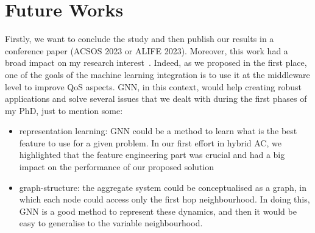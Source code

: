 \documentclass{article}
\begin{document}
\section{Future Works}
Firstly, we want to conclude the study and then publish our results in a conference paper (ACSOS 2023 or ALIFE 2023).
Moreover, this work had a broad impact on my research interest~\cite{aguzzi2021research, aguzzi2022addressing, aguzzi2022towards, DBLP:conf/icdcs/AguzziCV22}. 
Indeed, as we proposed in the first place, one of the goals of the machine learning integration is to use it at the middleware level to improve QoS aspects. 
GNN, in this context, would help creating robust applications and solve several issues that we dealt with during the first phases of my PhD, just to mention some:
\begin{itemize}
    \item representation learning: GNN could be a method to learn what is the best feature to use for a given problem. In our first effort in hybrid AC, we highlighted that the feature engineering part was crucial and had a big impact on the performance of our proposed solution
    \item graph-structure: the aggregate system could be conceptualised as a graph, in which each node could access only the first hop neighbourhood. 
    In doing this, GNN is a good method to represent these dynamics, and then it would be easy to generalise to the variable neighbourhood.
\end{itemize}


\end{document}
